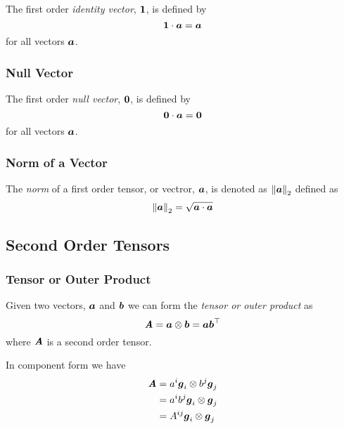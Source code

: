 The first order \emph{identity vector}, $  \boldsymbol{1}  $, is defined by
\begin{equation}
  \dotprod{\identitytensorone}{\vectr{a}}=\vectr{a}
  \label{eqn:DefinitionIdentityFirstOrder}
\end{equation}
for all vectors $ \boldsymbol{a} $.

\subsubsection{Null Vector}
\label{subsubsec:NullTensorFirstOrder}

The first order \emph{null vector}, $  \boldsymbol{ 0 }  $, is defined by
\begin{equation}
  \dotprod{\nulltensorone}{\vectr{a}}=\nulltensorone
  \label{eqn:DefinitionNullFirstOrder}
\end{equation}
for all vectors $ \boldsymbol{a} $.

\subsubsection{Norm of a Vector}
\label{subsubsec:NormTensorFirstOrder}

The \emph{norm} of a first order tensor, or vectror, $ \boldsymbol{a} $, is denoted as
$ {\left\|  \boldsymbol{a}  \right\|_{2}} $ defined as
\begin{equation}
   {\ensuremath{\left\|  \boldsymbol{a}  \right\|}_{2}} =\sqrt{  \boldsymbol{a}   \cdot   \boldsymbol{a}  }
\end{equation}

\subsection{Second Order Tensors}
\label{sec:TensorAlgebraSecondOrder}

\subsubsection{Tensor or Outer Product}
\label{subsubsec:TensorProductSecondOrder}

Given two vectors, $ \boldsymbol{a} $ and $ \boldsymbol{b} $ we can form the \emph{tensor or outer
product} as
\begin{equation}
  \boldsymbol{\mathit{A}}=  \boldsymbol{a}  \otimes  \boldsymbol{b}  = \boldsymbol{a}  { \boldsymbol{b} }^{ \top } 
\end{equation}
where $\boldsymbol{\mathit{A}}$ is a second order tensor.

In component form we have
\begin{equation}
  \begin{aligned}
    \boldsymbol{\mathit{A}}&= a^{i} \boldsymbol{g} _{i} \otimes  b^{j} \boldsymbol{g} _{j} \\
    &=a^{i}b^{j}  \boldsymbol{g} _{i} \otimes  \boldsymbol{g} _{j} \\
    &=A^{ij}  \boldsymbol{g} _{i} \otimes  \boldsymbol{g} _{j} 
  \end{aligned}
\end{equation}

